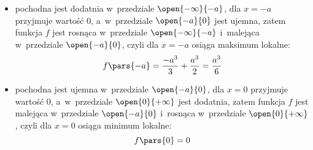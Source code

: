 \begin{proofcases}
\begin{itemize}
            \item pochodna jest dodatnia w~przedziale \(\open{-\infty}{-a}\), dla \(x = -a\) przyjmuje wartość \(0\), a~w~przedziale \(\open{-a}{0}\) jest ujemna, zatem funkcja \(f\) jest rosnąca w~przedziale \(\open{-\infty}{-a}\) i~malejąca w~przedziale \(\open{-a}{0}\), czyli dla \(x = -a\) osiąga maksimum lokalne:
                \begin{equation*}
                    f\pars{-a} = \frac{-a^3}{3} + \frac{a^3}{2} = \frac{a^3}{6}
                \end{equation*}
            \item pochodna jest ujemna w~przedziale \(\open{-a}{0}\), dla \(x = 0\) przyjmuje wartość \(0\), a~w~przedziale \(\open{0}{+\infty}\) jest dodatnia, zatem funkcja \(f\) jest malejąca w~przedziale \(\open{-a}{0}\) i~rosnąca w~przedziale \(\open{0}{+\infty}\), czyli dla \(x = 0\) osiąga minimum lokalne:
            \begin{equation*}
                f\pars{0} = 0                
            \end{equation*}
        \end{itemize}
\end{proofcases}
